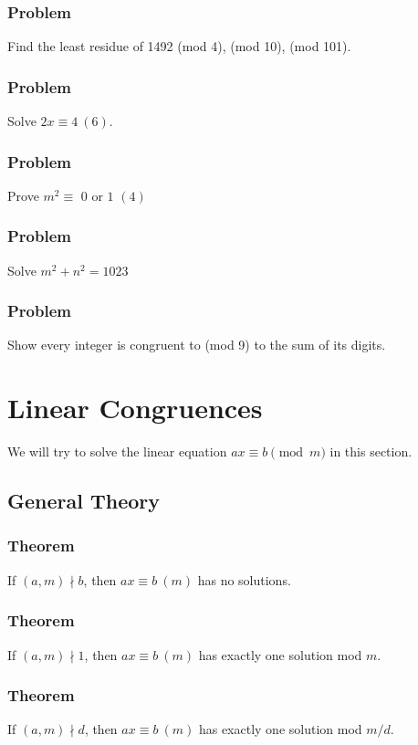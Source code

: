 \documentclass{article}
\begin{document}
\subsubsection{Problem}
Find the least residue of 1492 (mod 4), (mod 10), (mod 101).
\vspace{40px}
\subsubsection{Problem}
Solve $2x \equiv 4 \ (6)$.
\vspace{40px}
\subsubsection{Problem}
Prove $m^2 \equiv \text{ 0 or 1 } (4)$
\vspace{40px}
\subsubsection{Problem}
Solve $m^2+n^2=1023$
\vspace{40px}
\subsubsection{Problem}
Show every integer is congruent to (mod 9) to the sum of its digits.
\pagebreak

\section{Linear Congruences}
We will try to solve the linear equation $ax \equiv b \pmod{m}$ in this section.
\subsection{General Theory}
\subsubsection{Theorem}
If $(a, m) \nmid b$, then $ax \equiv b \ (m)$ has no solutions.
\vspace{50px}
\subsubsection{Theorem}
If $(a, m) \nmid 1$, then $ax \equiv b \ (m)$ has exactly one solution mod $m$.
\vspace{50px}
\subsubsection{Theorem}
If $(a, m) \nmid d$, then $ax \equiv b \ (m)$ has exactly one solution mod $m/d$.
\vspace{50px}
\end{document}
